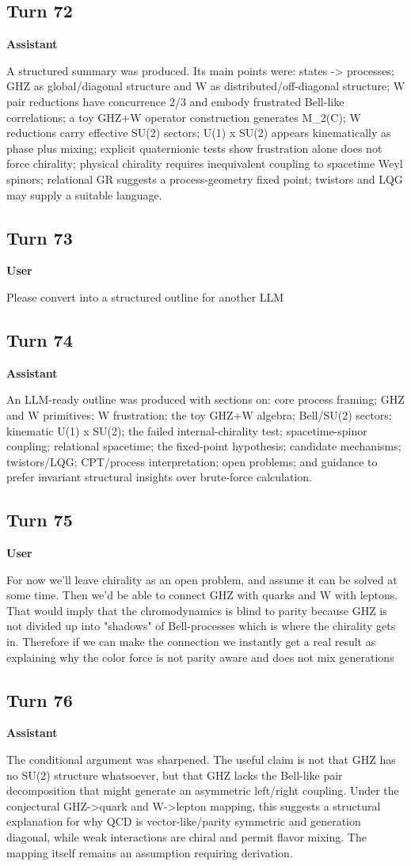 \documentclass[11pt,a4paper]{article}
\newcommand{\speaker}[1]{\par\medskip\noindent\textbf{\large #1}\par\smallskip}
\begin{document}
\subsection*{Turn 72}
\speaker{Assistant}
A structured summary was produced. Its main points were: states -> processes; GHZ as global/diagonal structure and W as distributed/off-diagonal structure; W pair reductions have concurrence 2/3 and embody frustrated Bell-like correlations; a toy GHZ+W operator construction generates M\_2(C); W reductions carry effective SU(2) sectors; U(1) x SU(2) appears kinematically as phase plus mixing; explicit quaternionic tests show frustration alone does not force chirality; physical chirality requires inequivalent coupling to spacetime Weyl spinors; relational GR suggests a process-geometry fixed point; twistors and LQG may supply a suitable language.
\subsection*{Turn 73}
\speaker{User}
Please convert into a structured outline for another LLM
\subsection*{Turn 74}
\speaker{Assistant}
An LLM-ready outline was produced with sections on: core process framing; GHZ and W primitives; W frustration; the toy GHZ+W algebra; Bell/SU(2) sectors; kinematic U(1) x SU(2); the failed internal-chirality test; spacetime-spinor coupling; relational spacetime; the fixed-point hypothesis; candidate mechanisms; twistors/LQG; CPT/process interpretation; open problems; and guidance to prefer invariant structural insights over brute-force calculation.
\subsection*{Turn 75}
\speaker{User}
For now we'll leave chirality as an open problem, and assume it can be solved at some time. Then we'd be able to connect GHZ with quarks and W with leptons. That would imply that the chromodynamics is blind to parity because GHZ is not divided up into "shadows" of Bell-processes which is where the chirality gets in. Therefore if we can make the connection we instantly get a real result as explaining why the color force is not parity aware and does not mix generations
\subsection*{Turn 76}
\speaker{Assistant}
The conditional argument was sharpened. The useful claim is not that GHZ has no SU(2) structure whatsoever, but that GHZ lacks the Bell-like pair decomposition that might generate an asymmetric left/right coupling. Under the conjectural GHZ->quark and W->lepton mapping, this suggests a structural explanation for why QCD is vector-like/parity symmetric and generation diagonal, while weak interactions are chiral and permit flavor mixing. The mapping itself remains an assumption requiring derivation.
\end{document}
